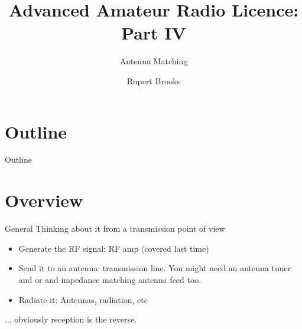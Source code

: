 \documentclass{beamer}
\title{Advanced Amateur Radio Licence: Part IV}
\subtitle{Antenna Matching}
\author{Rupert Brooks}
\begin{document}
\begin{frame}
\maketitle
\end{frame}



\section*{Outline}

\begin{frame}{Outline}{}
\tableofcontents
\end{frame}
\section{Overview}

\begin{frame}{General}{}
Thinking about it from a transmission point of view
\begin{itemize}
\item Generate the RF signal: RF amp (covered last time)
\item Send it to an antenna: transmission line.  You might need an antenna tuner and or and impedance matching antenna feed too.
\item Radiate it: Antennas, radiation, etc
\end{itemize}
... obviously reception is the reverse.
\end{frame}
\end{document}
